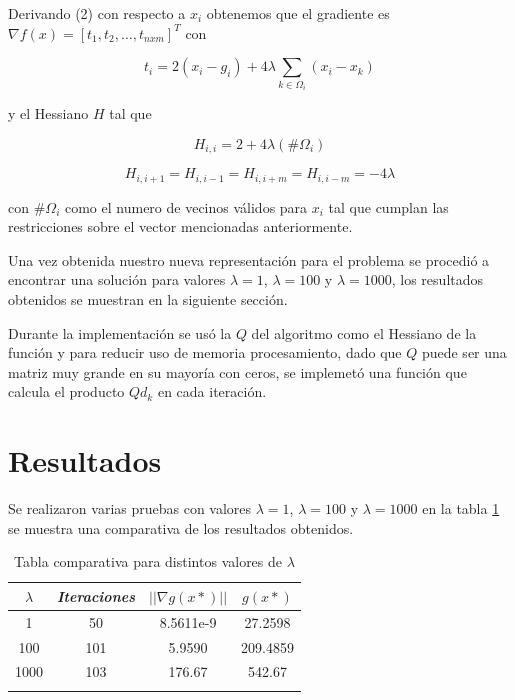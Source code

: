 \documentclass[conference]{IEEEtran}
\begin{document}
Derivando (2) con respecto a $x_i$ obtenemos que el gradiente es
$\nabla f(x) = [t_1, t_2, \dots, t_{nxm}]^T$ con

\begin{equation}
	t_i = 2(x_i - g_i) + 4\lambda \sum_{k \in \Omega_i} (x_i - x_k)
\end{equation}

y el Hessiano $H$ tal que

\begin{equation*}
	H_{i,i} = 2 + 4 \lambda (\#\Omega_i)
\end{equation*}

\begin{equation*}
	H_{i,i+1} = H_{i,i-1} = H_{i,i+m} = H_{i,i-m} = - 4 \lambda
\end{equation*}

con $\#\Omega_i$ como el numero de vecinos válidos para $x_i$ tal que cumplan las restricciones
sobre el vector mencionadas anteriormente.

Una vez obtenida nuestro nueva representación para el problema se procedió a encontrar una solución
para valores $\lambda=1$, $\lambda=100$ y $\lambda=1000$, los resultados obtenidos se muestran en la
siguiente sección.

Durante la implementación se usó la $Q$ del algoritmo como el Hessiano de la
función y para reducir uso de memoria  procesamiento, dado que $Q$ puede ser una matriz muy grande
en su mayoría con ceros, se implemetó una función que calcula el producto $Qd_k$ en cada iteración.

\section{Resultados}

Se realizaron varias pruebas con valores $\lambda=1$, $\lambda=100$ y $\lambda=1000$ en la tabla
\ref{tab1} se muestra una comparativa de los resultados obtenidos.

\begin{table}[htbp]
    \caption{Tabla comparativa para distintos valores de $\lambda$}
    \begin{center}
        \begin{tabular}{|c|c|c|c|}
            \hline
			\textbf{\textit{$\lambda$}}& \textbf{\textit{Iteraciones}}& \textbf{\textit{$||\nabla g(x*)||$}}& \textbf{\textit{$g(x*)$}} \\

            \hline
            1& 50 & 8.5611e-9 & 27.2598 \\
			100& 101 & 5.9590 & 209.4859 \\
			1000& 103 & 176.67 & 542.67 \\
            \hline
            \multicolumn{4}{l}{}
        \end{tabular}
        \label{tab1}
    \end{center}
\end{table}
\end{document}
